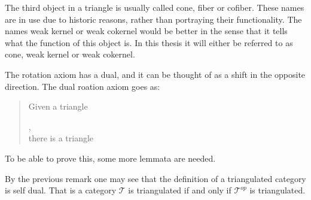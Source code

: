     \begin{remark}
        The third object in a triangle is usually called cone, fiber or cofiber. These names are in use due to historic reasons, rather than portraying their functionality. The names weak kernel or weak cokernel would be better in the sense that it tells what the function of this object is. In this thesis it will either be referred to as cone, weak kernel or weak cokernel.
    \end{remark}
    \begin{remark}
        The rotation axiom has a dual, and it can be thought of as a shift in the opposite direction. The dual roation axiom goes as:
        
        \begin{quote}
            Given a triangle ,\\
            there is a triangle 
        \end{quote} %
        
        To be able to prove this, some more lemmata are needed.
    \end{remark}

    \begin{remark}
        By the previous remark one may see that the definition of a triangulated category is self dual. That is a category $\mathcal{T}$ is triangulated if and only if $\mathcal{T}^{op}$ is triangulated.
    \end{remark}

